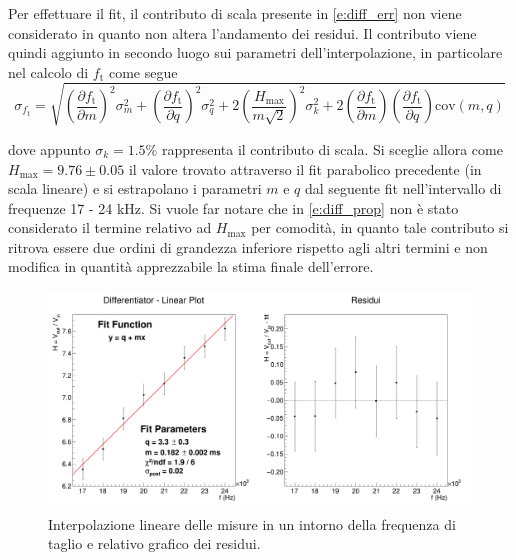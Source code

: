 \documentclass[a4paper,11pt]{article} %
\begin{document}
\noindent Per effettuare il fit, il contributo di scala presente in \autoref{e:diff_err} non viene considerato in quanto
non altera l'andamento dei residui. Il contributo viene quindi aggiunto in secondo luogo sui parametri
dell’interpolazione, in particolare nel calcolo di $f_{\text{t}}$ come segue
\begin{equation}\label{e:diff_prop}
	\sigma_{f_{\text{t}}}=\sqrt{
		\left(
			\frac{\partial f_{\text{t}}}{\partial m}
		\right)^2\sigma_m^2+
		\left(
			\frac{\partial f_{\text{t}}}{\partial q}
		\right)^2\sigma_q^2+
		2\left(
			\frac{H_{\text{max}}}{m\sqrt{2}}
		\right)^2\sigma_k^2+
		2\left(
			\frac{\partial f_{\text{t}}}{\partial m}
		\right)
		\left(
			\frac{\partial f_{\text{t}}}{\partial q}
		\right)\text{cov}(m,q)
	}
\end{equation}

\noindent dove appunto $\sigma_{k}=1.5\%$ rappresenta il contributo di scala. Si sceglie allora come $H_{\text{max}} =
9.76 \pm 0.05$ il valore trovato attraverso il fit parabolico precedente (in scala lineare) e si estrapolano i parametri
$m$ e $q$ dal seguente fit nell'intervallo di frequenze 17 - 24 kHz. Si vuole far notare che in \autoref{e:diff_prop}
non è stato considerato il termine relativo ad $H_{\text{max}}$ per comodità, in quanto tale contributo si ritrova
essere due ordini di grandezza inferiore rispetto agli altri termini e non modifica in quantità apprezzabile la stima
finale dell'errore.

\begin{figure}[H]
	\centering
	\includegraphics[width=\linewidth]{../Plots/Report_Plots/diff_linear.png}
	\caption{\small Interpolazione lineare delle misure in un intorno della frequenza di taglio e relativo grafico dei residui.}
	\label{i:diff_linear}
\end{figure}
\end{document}
